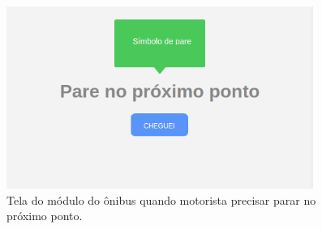 \documentclass[
	12pt,				%
	oneside,			%
	a4paper,			%
	brazil				%
]{abntex2}
\begin{document}
{\begin{figure}[!h]
\centering
\includegraphics[width=10cm, center]{images/busmodule-pare}
\caption{Tela do módulo do ônibus quando motorista precisar parar no próximo ponto.}
\label{Rotulo}
\end{figure}

}
\end{document}
